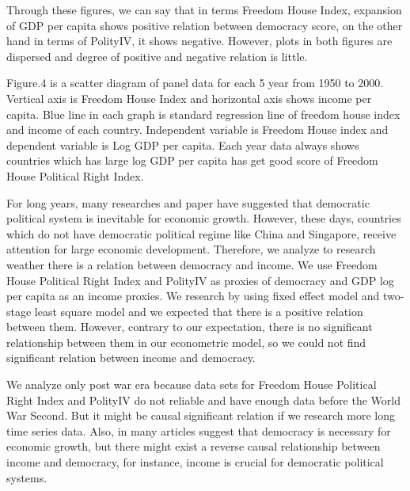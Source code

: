 \documentclass[a4paper,11pt]{article}
\begin{document}
Through these figures, we can say that in terms Freedom House Index, expansion of GDP per capita shows positive relation between democracy score, on the other hand in terms of PolityI\hspace{-.1em}V, it shows negative. However, plots in both figures are dispersed and degree of positive and negative relation is little.


Figure.4 is a scatter diagram of panel data for each 5 year from 1950 to 2000. Vertical axis is Freedom House Index and horizontal axis shows income per capita. Blue line in each graph is standard regression line of freedom house index and income of each country. Independent variable is Freedom House index and dependent variable is Log GDP per capita. Each year data always shows countries which has large log GDP per capita has get good score of Freedom House Political Right Index. 




For long years, many researches and paper have suggested that democratic political system is inevitable for economic growth. However, these days, countries which do not have democratic political regime like China and Singapore, receive attention for large economic development. Therefore, we analyze to research weather there is a relation between democracy and income. We use Freedom House Political Right Index and PolityI\hspace{-.1em}V as proxies of democracy and GDP log per capita as an income proxies. We research by using fixed effect model and two-stage least square model and we expected that there is a positive relation between them. However, contrary to our expectation, there is no significant relationship between them in our econometric model, so we could not find significant relation between income and democracy. 

We analyze only post war era because data sets for Freedom House Political Right Index and PolityI\hspace{-.1em}V do not reliable and have enough data before the World War Second. But it might be causal significant relation if we research more long time series data. Also, in many articles suggest that democracy is necessary for economic growth, but there might exist a reverse causal relationship between income and democracy, for instance, income is crucial for democratic political systems.


\appendix

\newpage
{}

\end{document}
